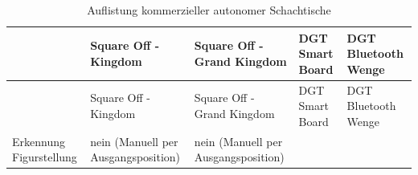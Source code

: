 \begin{longtable}[]{@{}lllll@{}}
\caption{Auflistung kommerzieller autonomer Schachtische}\tabularnewline
\toprule
\begin{minipage}[b]{0.18\columnwidth}\raggedright
\strut
\end{minipage} & \begin{minipage}[b]{0.18\columnwidth}\raggedright
Square Off - Kingdom \cite{squareoffkingdom}\strut
\end{minipage} & \begin{minipage}[b]{0.22\columnwidth}\raggedright
Square Off - Grand Kingdom \cite{squareoffgrand}\strut
\end{minipage} & \begin{minipage}[b]{0.15\columnwidth}\raggedright
DGT Smart Board \cite{dtgsmartboard}\strut
\end{minipage} & \begin{minipage}[b]{0.13\columnwidth}\raggedright
DGT Bluetooth Wenge \cite{dtgble}\strut
\end{minipage}\tabularnewline
\midrule
\endfirsthead
\toprule
\begin{minipage}[b]{0.18\columnwidth}\raggedright
\strut
\end{minipage} & \begin{minipage}[b]{0.18\columnwidth}\raggedright
Square Off - Kingdom \cite{squareoffkingdom}\strut
\end{minipage} & \begin{minipage}[b]{0.22\columnwidth}\raggedright
Square Off - Grand Kingdom \cite{squareoffgrand}\strut
\end{minipage} & \begin{minipage}[b]{0.15\columnwidth}\raggedright
DGT Smart Board \cite{dtgsmartboard}\strut
\end{minipage} & \begin{minipage}[b]{0.13\columnwidth}\raggedright
DGT Bluetooth Wenge \cite{dtgble}\strut
\end{minipage}\tabularnewline
\midrule
\endhead
\begin{minipage}[t]{0.18\columnwidth}\raggedright
Erkennung Figurstellung\strut
\end{minipage} & \begin{minipage}[t]{0.18\columnwidth}\raggedright
nein (Manuell per Ausgangsposition)\strut
\end{minipage} & \begin{minipage}[t]{0.22\columnwidth}\raggedright
nein (Manuell per Ausgangsposition)\strut
\end{minipage} & \begin{minipage}[t]{0.15\columnwidth}\raggedright

\end{minipage}
\end{longtable}

